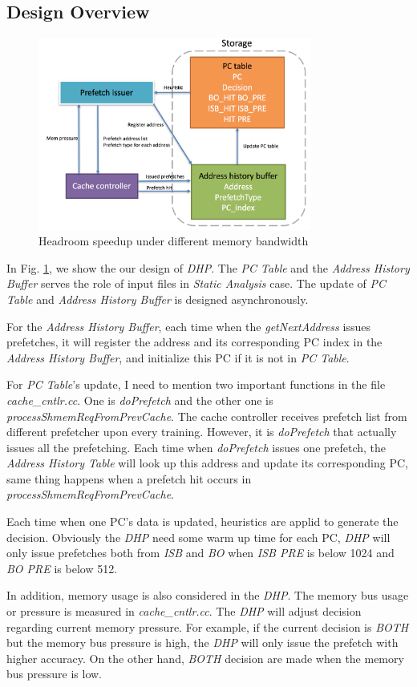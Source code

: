   \subsection{Design Overview}
  \label{sec:dynamicdesignoverview}
  \begin{figure}[ht!]
	   \centering
	   \includegraphics[width=0.8\textwidth]{images/dynamic_design.png}
	   \caption{Headroom speedup under different memory bandwidth}
	   \label{fig:dynamic_design}
  \end{figure}

  In Fig. \ref{fig:dynamic_design}, we show the our design of \emph{DHP}. The \emph{PC Table} and the \emph{Address History Buffer} serves the role of input files in \emph{Static Analysis} case. The update of \emph{PC Table} and \emph{Address History Buffer} is designed asynchronously.

  For the \emph{Address History Buffer}, each time when the \emph{getNextAddress} issues prefetches, it will register the address and its corresponding PC index in the \emph{Address History Buffer}, and initialize this PC if it is not in \emph{PC Table}.

  For \emph{PC Table}'s update, I need to mention two important functions in the file \emph{cache\_cntlr.cc}. One is \emph{doPrefetch} and the other one is \emph{processShmemReqFromPrevCache}. The cache controller receives prefetch list from different prefetcher upon every training. However, it is  \emph{doPrefetch} that actually issues all the prefetching. Each time when \emph{doPrefetch} issues one prefetch, the \emph{Address History Table} will look up this address and update its corresponding PC, same thing happens when a prefetch hit occurs in \emph{processShmemReqFromPrevCache}.

  Each time when one PC's data is updated, heuristics are applid to generate the decision. Obviously the \emph{DHP} need some warm up time for each PC, \emph{DHP} will only issue prefetches both from \emph{ISB} and \emph{BO} when \emph{ISB PRE} is below 1024 and \emph{BO PRE} is below 512.

  In addition, memory usage is also considered in the \emph{DHP}. The memory bus usage or pressure is measured in \emph{cache\_cntlr.cc}. The \emph{DHP} will adjust decision regarding current memory pressure. For example, if the current decision is \emph{BOTH} but the memory bus pressure is high, the \emph{DHP} will only issue the prefetch with higher accuracy. On the other hand, \emph{BOTH} decision are made when the memory bus pressure is low.

